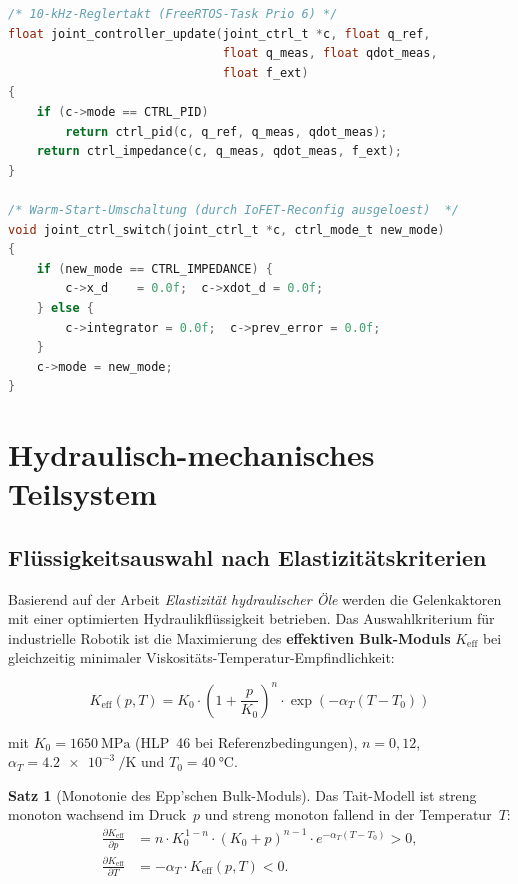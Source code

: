 ﻿\documentclass[a4paper,12pt]{scrreprt}
\theoremstyle{definition}
\newtheorem{satz}{Satz}[section]
\begin{document}
\begin{lstlisting}[language=C,
  caption={joint\_controller.c -- PID/Impedanz-Gelenkeregler
    mit hydraulischem Epp-Feedforward auf STM32H7 Cortex-M7 (10 kHz).},
  label={lst:joint_ctrl}]
/* 10-kHz-Reglertakt (FreeRTOS-Task Prio 6) */
float joint_controller_update(joint_ctrl_t *c, float q_ref,
                              float q_meas, float qdot_meas,
                              float f_ext)
{
    if (c->mode == CTRL_PID)
        return ctrl_pid(c, q_ref, q_meas, qdot_meas);
    return ctrl_impedance(c, q_meas, qdot_meas, f_ext);
}

/* Warm-Start-Umschaltung (durch IoFET-Reconfig ausgeloest)  */
void joint_ctrl_switch(joint_ctrl_t *c, ctrl_mode_t new_mode)
{
    if (new_mode == CTRL_IMPEDANCE) {
        c->x_d    = 0.0f;  c->xdot_d = 0.0f;
    } else {
        c->integrator = 0.0f;  c->prev_error = 0.0f;
    }
    c->mode = new_mode;
}
\end{lstlisting}

\section{Hydraulisch-mechanisches Teilsystem}

\subsection{Flüssigkeitsauswahl nach Elastizitätskriterien}

Basierend auf der Arbeit \emph{Elastizität hydraulischer Öle} werden
die Gelenkaktoren mit einer optimierten Hydraulikflüssigkeit betrieben.
Das Auswahlkriterium für industrielle Robotik ist die Maximierung des
\textbf{effektiven Bulk-Moduls} $K_{\text{eff}}$ bei gleichzeitig
minimaler Viskositäts-Temperatur-Empfindlichkeit:

\begin{equation}
  K_{\text{eff}}(p, T) = K_0 \cdot
  \left(1 + \frac{p}{K_0}\right)^n \cdot
  \exp\!\left(-\alpha_T (T - T_0)\right)
\end{equation}

mit $K_0 = \SI{1650}{\mega\pascal}$ (HLP~46 bei Referenzbedingungen),
$n = 0{,}12$, $\alpha_T = \SI{4.2e-3}{\per\kelvin}$ und
$T_0 = \SI{40}{\celsius}$.

\begin{satz}[Monotonie des Epp'schen Bulk-Moduls]
\label{satz:bulkmonoton}
Das Tait-Modell ist streng monoton wachsend im Druck~$p$ und streng
monoton fallend in der Temperatur~$T$:
\begin{align}
  \frac{\partial K_{\text{eff}}}{\partial p}
  &= n \cdot K_0^{\,1-n} \cdot (K_0 + p)^{n-1}
     \cdot e^{-\alpha_T(T-T_0)} > 0, \label{eq:dKdp}\\
  \frac{\partial K_{\text{eff}}}{\partial T}
  &= -\alpha_T \cdot K_{\text{eff}}(p,T) < 0. \label{eq:dKdT}
\end{align}
\end{satz}
\end{document}

